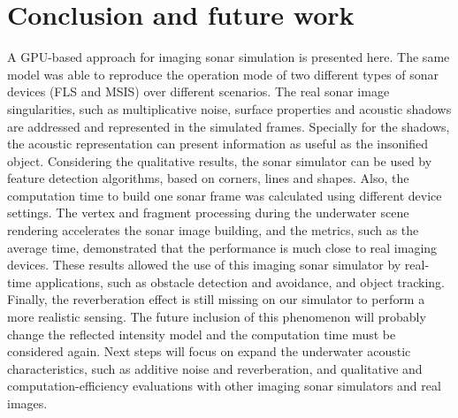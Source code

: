 \documentclass[final,5p,times]{elsarticle}
\begin{document}

\section{Conclusion and future work}
\label{conclusion}

A GPU-based approach for imaging sonar simulation is presented here.
The same model was able to reproduce the operation mode of two different
types of sonar devices (FLS and MSIS) over different scenarios. The real
sonar image singularities, such as multiplicative noise, surface
properties and acoustic shadows are addressed and represented in the
simulated frames. Specially for the shadows, the acoustic representation
can present information as useful as the insonified object. Considering
the qualitative results, the sonar simulator can be used by feature detection
algorithms, based on corners, lines and shapes. Also, the computation time
to build one sonar frame was calculated using different device settings.
The vertex and fragment processing during the underwater scene rendering
accelerates the sonar image building, and the metrics, such as the average
time, demonstrated that the performance is much close to real imaging
devices. These results allowed the use of this imaging sonar simulator
by real-time applications, such as obstacle detection and avoidance, and
object tracking. Finally, the reverberation effect is still missing on
our simulator to perform a more realistic sensing. The future inclusion
of this phenomenon will probably change the reflected intensity model
and the computation time must be considered again. Next steps will
focus on expand the underwater acoustic characteristics, such as additive
noise and reverberation, and qualitative and computation\hyp{}efficiency
evaluations with other imaging sonar simulators and real images.









\end{document}
